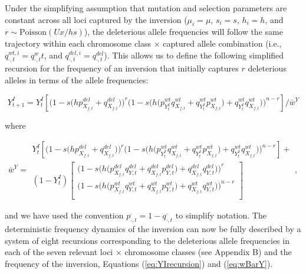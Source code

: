 \documentclass[11pt]{article}
\begin{document}
Under the simplifying assumption that mutation and selection parameters are constant across all loci captured by the inversion ($\mu_i = \mu$, $s_i = s$, $h_i = h$, and $r \sim \text{Poisson}(Ux/hs)$), the deleterious allele frequencies will follow the same trajectory within each chromosome class $\times$ captured allele combination (i.e., $q_{\cdot,t}^{wt,i} = q_{\cdot,t}^wt$, and $q_{\cdot,t}^{del,i}=q_{\cdot,t}^{del}$). This allows us to define the following simplified recursion for the frequency of an inversion that initially captures $r$ deleterious alleles in terms of the allele frequencies:
\begin{linenomath*}
\begin{equation} \label{eq:YIrecursion}
  Y^I_{t+1} = Y^I_{t} \left[ \Big(1 - s \big(h p^{del}_{X_{f,t}} + q^{del}_{X_{f,t}} \big) \Big)^r 
                             \bigg(1 - s \Big(h \big(p^{wt}_{Y^I_{t}} q^{wt}_{X_{f,t}} + q^{wt}_{Y^I_{t}} p^{wt}_{X_{f,t}} \big) + q^{wt}_{Y^I_{t}} q^{wt}_{X_{f,t}} \Big) \bigg)^{n-r} \right] / \bar{w}^Y
\end{equation}
\end{linenomath*}
\noindent where
\begin{linenomath*}
\begin{equation} \label{eq:wBarY}
  \bar{w}^Y =  \begin{array}{c}
                  Y^I_{t} \left[ \Big(1 - s \big(h p^{del}_{X_{f,t}} + q^{del}_{X_{f,t}} \big) \Big)^r 
                             \bigg(1 - s \Big(h \big(p^{wt}_{Y^I_{t}} q^{wt}_{X_{f,t}} + q^{wt}_{Y^I_{t}} p^{wt}_{X_{f,t}} \big) + q^{wt}_{Y^I_{t}} q^{wt}_{X_{f,t}} \Big) \bigg)^{n-r} \right] +\\
                  (1 - Y^I_{t}) \left[
                                      \begin{array}{c}
                                        \bigg(1 - s \Big(h \big(p^{del}_{X_{f,t}} q^{del}_{Y,t} + q^{del}_{X_{f,t}} p^{del}_{Y,t} \big) + q^{del}_{X_{f,t}} q^{del}_{Y,t} \Big) \bigg)^r \\
                                        \bigg(1 - s \Big(h \big(p^{wt}_{X_{f,t}} q^{wt}_{Y,t} + q^{wt}_{X_{f,t}} p^{wt}_{Y,t} \big) + q^{wt}_{X_{f,t}} q^{wt}_{Y,t} \Big) \bigg)^{n-r} \\
                                      \end{array}\right]
            \end{array},
\end{equation}
\end{linenomath*}
\noindent and we have used the convention $p_{\cdot,t}^\cdot=1-q_{\cdot,t}^\cdot$ to simplify notation. The deterministic frequency dynamics of the inversion can now be fully described by a system of eight recursions corresponding to the deleterious allele frequencies in each of the seven relevant loci $\times$ chromosome classes (see Appendix B) and the frequency of the inversion, Equations (\ref{eq:YIrecursion}) and (\ref{eq:wBarY}).
\end{document}
